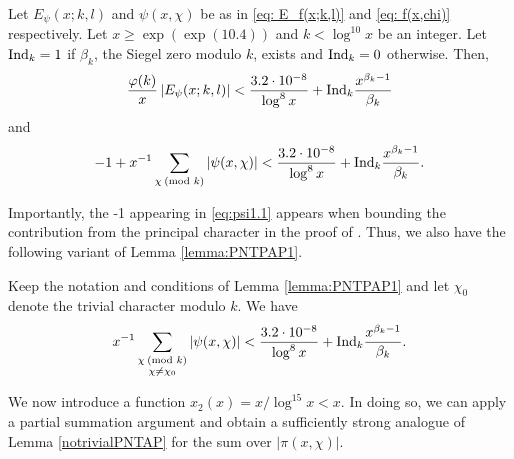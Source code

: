 \documentclass[12pt]{amsart}
\begin{document}
\begin{lemma}
\label{lemma:PNTPAP1}
Let $E_\psi(x;k,l)$ and $\psi(x,\chi)$ be as in \eqref{eq: E_f(x;k,l)} and \eqref{eq: f(x,chi)} respectively. Let ${x\ge\exp (\exp (10.4))}$ and $k<\log^{10} x$ be an integer. Let $\textnormal{Ind}_k=1$ if $\beta_k$, the Siegel zero modulo $k$, exists and $\textnormal{Ind}_k=0$ otherwise. Then,
\begin{equation*}
\label{eq:psi1}
\frac{\varphi(k)}{x}\left|E_{\psi}(x;k,l)\right|< \frac{3.2\cdot 10^{-8}}{\log^{8} x}+\textnormal{Ind}_k \frac{x^{\beta_k-1}}{\beta_k}
\end{equation*}
and 
\begin{equation}
\label{eq:psi1.1}
-1+x^{-1}\sum_{\chi\: (\text{mod }k)} \left|\psi(x,\chi)\right|< \frac{3.2\cdot 10^{-8}}{\log^{8} x}+\textnormal{Ind}_k \frac{x^{\beta_k-1}}{\beta_k}.
\end{equation}
\end{lemma}
Importantly, the -1 appearing in \eqref{eq:psi1.1} appears when bounding the contribution from the principal character in the proof of \cite[Theorem 1.2]{Bordignon4}. Thus, we also have the following variant of Lemma \ref{lemma:PNTPAP1}.
\begin{lemma}\label{notrivialPNTAP}
    Keep the notation and conditions of Lemma \ref{lemma:PNTPAP1} and let $\chi_0$ denote the trivial character modulo $k$. We have
    \begin{equation*}
        x^{-1}\sum_{\substack{\chi\: (\text{mod }k) \\ \chi \ne \chi_0}} \left|\psi(x,\chi)\right|< \frac{3.2\cdot 10^{-8}}{\log^{8} x}+\textnormal{Ind}_k \frac{x^{\beta_k-1}}{\beta_k}.
    \end{equation*}
\end{lemma}
We now introduce a function $x_2(x)=x/\log^{15}x<x$. In doing so, we can apply a partial summation argument and obtain a sufficiently strong analogue of Lemma \ref{notrivialPNTAP} for the sum over $|\pi(x,\chi)|$. 
\end{document}

